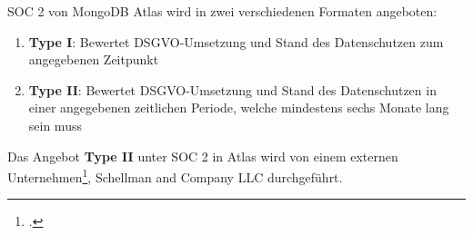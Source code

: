 SOC 2 von MongoDB Atlas wird in zwei verschiedenen Formaten angeboten:

\begin{enumerate}
	\item \textbf{Type I}: Bewertet DSGVO-Umsetzung und Stand des Datenschutzen zum angegebenen Zeitpunkt 
	\item \textbf{Type II}: Bewertet DSGVO-Umsetzung und Stand des Datenschutzen in einer angegebenen zeitlichen Periode, welche mindestens sechs Monate lang sein muss
\end{enumerate}

Das Angebot \textbf{Type II} unter SOC 2 in Atlas wird von einem externen Unternehmen\footcite{atlas-soc2}, Schellman and Company LLC durchgeführt.
\newpage